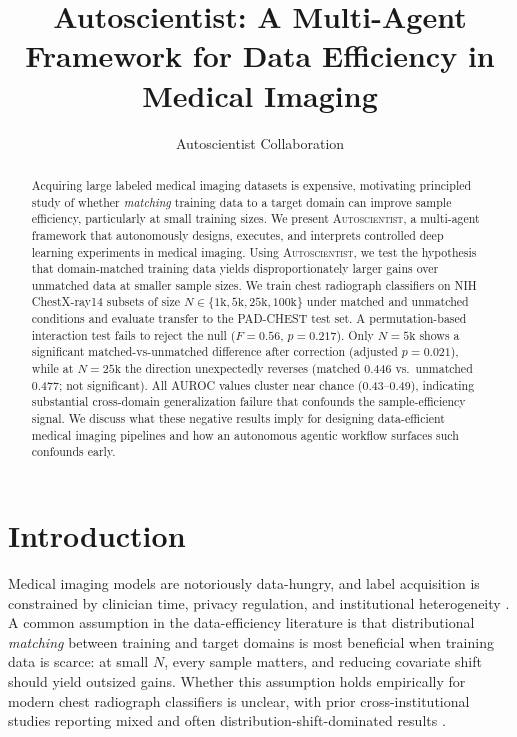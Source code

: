 \documentclass[11pt]{article}
\title{Autoscientist: A Multi-Agent Framework for Data Efficiency in Medical Imaging}
\author{Autoscientist Collaboration}
\date{}
\begin{document}
\maketitle

\begin{abstract}
Acquiring large labeled medical imaging datasets is expensive, motivating principled study of whether \emph{matching} training data to a target domain can improve sample efficiency, particularly at small training sizes. We present \textsc{Autoscientist}, a multi-agent framework that autonomously designs, executes, and interprets controlled deep learning experiments in medical imaging. Using \textsc{Autoscientist}, we test the hypothesis that domain-matched training data yields disproportionately larger gains over unmatched data at smaller sample sizes. We train chest radiograph classifiers on NIH ChestX-ray14 subsets of size $N \in \{1\text{k}, 5\text{k}, 25\text{k}, 100\text{k}\}$ under matched and unmatched conditions and evaluate transfer to the PAD-CHEST test set. A permutation-based interaction test fails to reject the null ($F=0.56$, $p=0.217$). Only $N=5\text{k}$ shows a significant matched-vs-unmatched difference after correction (adjusted $p=0.021$), while at $N=25\text{k}$ the direction unexpectedly reverses (matched 0.446 vs.\ unmatched 0.477; not significant). All AUROC values cluster near chance (0.43--0.49), indicating substantial cross-domain generalization failure that confounds the sample-efficiency signal. We discuss what these negative results imply for designing data-efficient medical imaging pipelines and how an autonomous agentic workflow surfaces such confounds early.
\end{abstract}

\section{Introduction}

Medical imaging models are notoriously data-hungry, and label acquisition is constrained by clinician time, privacy regulation, and institutional heterogeneity \cite{rajpurkar2017chexnet,cohen2020limits}. A common assumption in the data-efficiency literature is that distributional \emph{matching} between training and target domains is most beneficial when training data is scarce: at small $N$, every sample matters, and reducing covariate shift should yield outsized gains. Whether this assumption holds empirically for modern chest radiograph classifiers is unclear, with prior cross-institutional studies reporting mixed and often distribution-shift-dominated results \cite{zech2018variable}.
\end{document}

